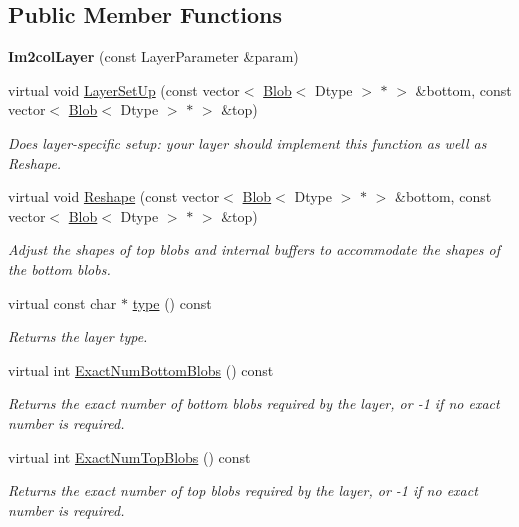 \subsection*{Public Member Functions}
\begin{DoxyCompactItemize}
\item 
{\bfseries Im2col\+Layer} (const Layer\+Parameter \&param)\hypertarget{classcaffe_1_1Im2colLayer_aec089ca3ca3caf3d32193b9dcb2f98e1}{}\label{classcaffe_1_1Im2colLayer_aec089ca3ca3caf3d32193b9dcb2f98e1}

\item 
virtual void \hyperlink{classcaffe_1_1Im2colLayer_a73d7e780b38406dc3d840649cadf8f8a}{Layer\+Set\+Up} (const vector$<$ \hyperlink{classcaffe_1_1Blob}{Blob}$<$ Dtype $>$ $\ast$ $>$ \&bottom, const vector$<$ \hyperlink{classcaffe_1_1Blob}{Blob}$<$ Dtype $>$ $\ast$ $>$ \&top)
\begin{DoxyCompactList}\small\item\em Does layer-\/specific setup\+: your layer should implement this function as well as Reshape. \end{DoxyCompactList}\item 
virtual void \hyperlink{classcaffe_1_1Im2colLayer_a79735ab9fb43a53e4ca02e33a0b3f181}{Reshape} (const vector$<$ \hyperlink{classcaffe_1_1Blob}{Blob}$<$ Dtype $>$ $\ast$ $>$ \&bottom, const vector$<$ \hyperlink{classcaffe_1_1Blob}{Blob}$<$ Dtype $>$ $\ast$ $>$ \&top)
\begin{DoxyCompactList}\small\item\em Adjust the shapes of top blobs and internal buffers to accommodate the shapes of the bottom blobs. \end{DoxyCompactList}\item 
virtual const char $\ast$ \hyperlink{classcaffe_1_1Im2colLayer_aac44aaa893e6fb774c1953b523180cea}{type} () const \hypertarget{classcaffe_1_1Im2colLayer_aac44aaa893e6fb774c1953b523180cea}{}\label{classcaffe_1_1Im2colLayer_aac44aaa893e6fb774c1953b523180cea}

\begin{DoxyCompactList}\small\item\em Returns the layer type. \end{DoxyCompactList}\item 
virtual int \hyperlink{classcaffe_1_1Im2colLayer_aba3720be3f1f71f9e44fbfba90ae3ac0}{Exact\+Num\+Bottom\+Blobs} () const 
\begin{DoxyCompactList}\small\item\em Returns the exact number of bottom blobs required by the layer, or -\/1 if no exact number is required. \end{DoxyCompactList}\item 
virtual int \hyperlink{classcaffe_1_1Im2colLayer_aa4aa1cfc956fa1ab3656ad2adf911f32}{Exact\+Num\+Top\+Blobs} () const 
\begin{DoxyCompactList}\small\item\em Returns the exact number of top blobs required by the layer, or -\/1 if no exact number is required. \end{DoxyCompactList}\end{DoxyCompactItemize}
